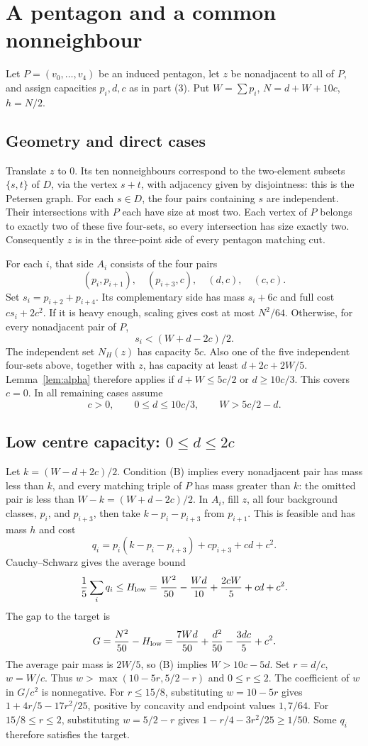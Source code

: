 \documentclass[11pt]{article}
\begin{document}
\section{A pentagon and a common nonneighbour}
Let $P=(v_0,\ldots,v_4)$ be an induced pentagon, let $z$ be nonadjacent
to all of $P$, and assign capacities $p_i,d,c$ as in part (3).
Put $W=\sum p_i$, $N=d+W+10c$, $h=N/2$.

\subsection{Geometry and direct cases}
Translate $z$ to $0$. Its ten nonneighbours correspond to the two-element
subsets $\{s,t\}$ of $D$, via the vertex $s+t$,
with adjacency given by disjointness: this is the Petersen
graph. For each $s\in D$, the four pairs containing $s$ are independent.
Their intersections with $P$ each have size at most two.
Each vertex of $P$ belongs to exactly two of these five four-sets,
so every intersection has size exactly two.
Consequently $z$ is in the three-point side of every pentagon matching cut.

For each $i$, that side $A_i$ consists of the four pairs
\[
 (p_i,p_{i+1}),\quad(p_{i+3},c),\quad(d,c),\quad(c,c).
\]
Set $s_i=p_{i+2}+p_{i+4}$.
Its complementary side has mass $s_i+6c$ and full cost $cs_i+2c^2$.
If it is heavy enough, scaling gives cost at most $N^2/64$.
Otherwise, for every nonadjacent pair of $P$,
\[
 s_i<(W+d-2c)/2. \tag{B}
\]
The independent set $N_H(z)$ has capacity $5c$.
Also one of the five independent four-sets above, together with $z$,
has capacity at least $d+2c+2W/5$.
Lemma~\ref{lem:alpha} therefore applies if $d+W\leq5c/2$ or
$d\geq10c/3$. This covers $c=0$.
In all remaining cases assume
\[
 c>0,\qquad 0\leq d\leq10c/3,\qquad W>5c/2-d. \tag{I}
\]

\subsection{Low centre capacity: $0\leq d\leq2c$}
Let $k=(W-d+2c)/2$.
Condition (B) implies every nonadjacent pair has mass less than $k$,
and every matching triple of $P$ has mass greater than $k$:
the omitted pair is less than $W-k=(W+d-2c)/2$.
In $A_i$, fill $z$, all four background classes, $p_i$, and $p_{i+3}$,
then take $k-p_i-p_{i+3}$ from $p_{i+1}$.
This is feasible and has mass $h$ and cost
\[
 q_i=p_i(k-p_i-p_{i+3})+cp_{i+3}+cd+c^2 .
\]
Cauchy--Schwarz gives the average bound
\[
 \frac15\sum_iq_i\leq H_{\rm low}
 =\frac{W^2}{50}-\frac{Wd}{10}+\frac{2cW}{5}+cd+c^2.
\]
The gap to the target is
\[
 G=\frac{N^2}{50}-H_{\rm low}
   =\frac{7Wd}{50}+\frac{d^2}{50}-\frac{3dc}{5}+c^2.
\]
The average pair mass is $2W/5$, so (B) implies $W>10c-5d$.
Set $r=d/c$, $w=W/c$.
Thus $w>\max(10-5r,5/2-r)$ and $0\leq r\leq2$.
The coefficient of $w$ in $G/c^2$ is nonnegative.
For $r\leq15/8$, substituting $w=10-5r$ gives
$1+4r/5-17r^2/25$, positive by concavity and endpoint values
$1,7/64$.
For $15/8\leq r\leq2$, substituting $w=5/2-r$ gives
$1-r/4-3r^2/25\geq1/50$.
Some $q_i$ therefore satisfies the target.
\end{document}
